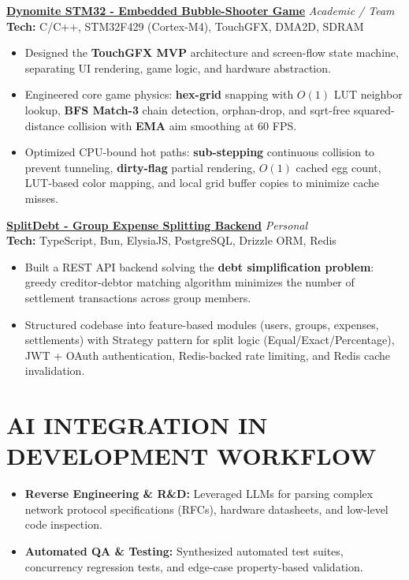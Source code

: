 \documentclass[10pt,a4paper]{article}
\newcommand{\project}[3]{
    {\normalsize\textbf{#1}} \hfill {\footnotesize\textit{#2}} \\
    {\footnotesize\textbf{Tech: }#3} \vspace{2pt}
}
\begin{document}
\begin{minipage}[t]{0.66\textwidth}
    \project{\href{https://github.com/DuongAn15/DynomiteGame}{Dynomite STM32 - Embedded Bubble-Shooter Game}}{Academic / Team}{C/C++, STM32F429 (Cortex-M4), TouchGFX, DMA2D, SDRAM}
    \begin{itemize}
        \item Designed the \textbf{TouchGFX MVP} architecture and screen-flow state machine, separating UI rendering, game logic, and hardware abstraction.
        \item Engineered core game physics: \textbf{hex-grid} snapping with $O(1)$ LUT neighbor lookup, \textbf{BFS Match-3} chain detection, orphan-drop, and sqrt-free squared-distance collision with \textbf{EMA} aim smoothing at 60 FPS.
        \item Optimized CPU-bound hot paths: \textbf{sub-stepping} continuous collision to prevent tunneling, \textbf{dirty-flag} partial rendering, $O(1)$ cached egg count, LUT-based color mapping, and local grid buffer copies to minimize cache misses.
    \end{itemize}
    \vspace{0.15cm}

    \project{\href{https://github.com/nguyen10t2/SplitDebt}{SplitDebt - Group Expense Splitting Backend}}{Personal}{TypeScript, Bun, ElysiaJS, PostgreSQL, Drizzle ORM, Redis}
    \begin{itemize}
        \item Built a REST API backend solving the \textbf{debt simplification problem}: greedy creditor-debtor matching algorithm minimizes the number of settlement transactions across group members.
        \item Structured codebase into feature-based modules (users, groups, expenses, settlements) with Strategy pattern for split logic (Equal/Exact/Percentage), JWT + OAuth authentication, Redis-backed rate limiting, and Redis cache invalidation.
    \end{itemize}

    \section*{AI INTEGRATION IN DEVELOPMENT WORKFLOW}
    \begin{itemize}
        \item \textbf{Reverse Engineering \& R\&D:} Leveraged LLMs for parsing complex network protocol specifications (RFCs), hardware datasheets, and low-level code inspection.
        \item \textbf{Automated QA \& Testing:} Synthesized automated test suites, concurrency regression tests, and edge-case property-based validation.
    \end{itemize}

\end{minipage}
\end{document}
